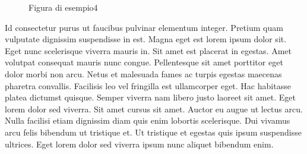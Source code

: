 \documentclass[a4]{report}
\begin{document}
\begin{figure}
  \centering
  \caption{Figura di esempio4} \label{fig:3}
  \par
\end{figure}
Id consectetur purus ut faucibus pulvinar elementum integer. Pretium quam vulputate dignissim suspendisse in est. Magna eget est lorem ipsum dolor sit. Eget nunc scelerisque viverra mauris in. Sit amet est placerat in egestas. Amet volutpat consequat mauris nunc congue. Pellentesque sit amet porttitor eget dolor morbi non arcu. Netus et malesuada fames ac turpis egestas maecenas pharetra convallis. Facilisis leo vel fringilla est ullamcorper eget. Hac habitasse platea dictumst quisque. Semper viverra nam libero justo laoreet sit amet. Eget lorem dolor sed viverra. Sit amet cursus sit amet. Auctor eu augue ut lectus arcu. Nulla facilisi etiam dignissim diam quis enim lobortis scelerisque. Dui vivamus arcu felis bibendum ut tristique et. Ut tristique et egestas quis ipsum suspendisse ultrices. Eget lorem dolor sed viverra ipsum nunc aliquet bibendum enim.
\end{document}
